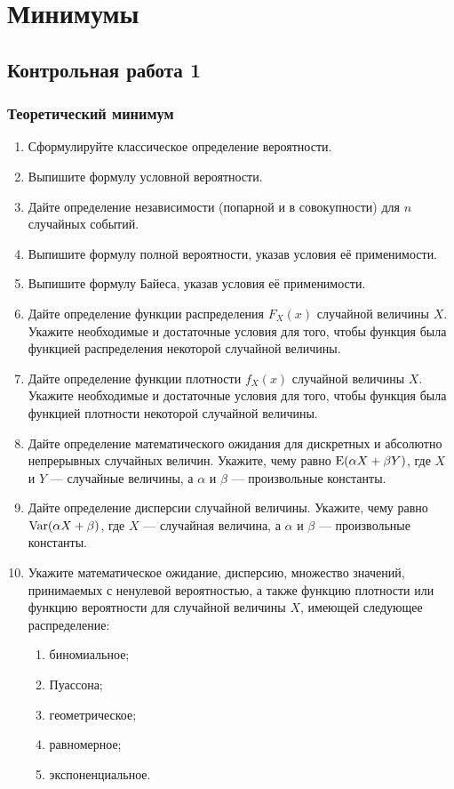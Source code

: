 \newpage
\thispagestyle{empty}
\section{Минимумы}

\subsection{Контрольная работа 1}


\subsubsection*{Теоретический минимум}


\begin{enumerate}
	\item Сформулируйте классическое определение вероятности.
	\item Выпишите формулу условной вероятности.
	\item Дайте определение независимости (попарной и в совокупности) для $n$ случайных событий.
	\item Выпишите формулу полной вероятности, указав условия её применимости.
	\item Выпишите формулу Байеса, указав условия её применимости.
	\item Дайте определение функции распределения $F_{X}(x)$ случайной величины $X$. 
	Укажите необходимые и достаточные условия для того, чтобы  функция
	была функцией распределения некоторой случайной величины.
	\item Дайте определение функции плотности $f_{X}(x)$ случайной величины $X$. 
	Укажите необходимые и достаточные условия для того, чтобы  функция
была функцией плотности некоторой случайной величины.

	\item Дайте определение математического ожидания для дискретных и абсолютно непрерывных случайных величин. 
	Укажите, чему равно $\operatorname{E}(\alpha X+\beta Y)$, где $X$ и $Y$ — случайные величины, а $\alpha$ и $\beta$ — произвольные константы.
	\item Дайте определение дисперсии случайной величины. 
	Укажите, чему равно $\operatorname{Var}(\alpha X+\beta)$, где $X$ — случайная величина, 
	а $\alpha$ и $\beta$ — произвольные константы.
	\item Укажите математическое ожидание, дисперсию, множество значений, 
	принимаемых с ненулевой вероятностью, а также функцию плотности или функцию вероятности для случайной величины $X$, 
	имеющей следующее распределение:
	\begin{enumerate}
	\item биномиальное;
	\item Пуассона;
	\item геометрическое;
	\item равномерное;
	\item экспоненциальное.
	\end{enumerate}
\end{enumerate}

